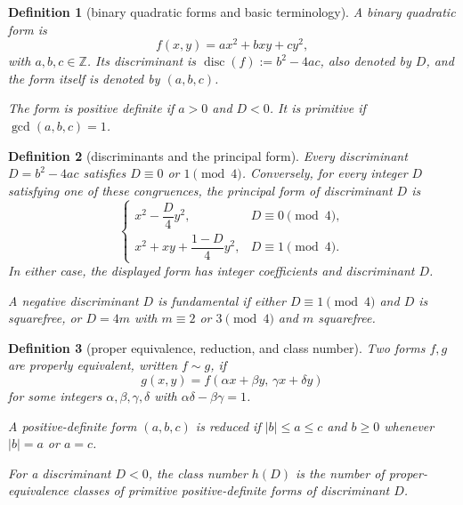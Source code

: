 \documentclass[11pt]{article}
\theoremstyle{ntstyle}
\newtheorem{definition}{Definition}[subsection]
\DeclareMathOperator{\disc}{disc}
\begin{document}
\begin{definition}[binary quadratic forms and basic terminology]\label{def:8.6.1}
	A binary quadratic form is
	\[
		f(x,y)=ax^2+bxy+cy^2,
	\]
	with $a,b,c\in\mathbb{Z}$. Its discriminant is
	$\disc(f):=b^2-4ac$, also denoted by $D$, and the form itself is
	denoted by $(a,b,c)$.

	The form is positive definite if $a>0$ and $D<0$. It is primitive if
	$\gcd(a,b,c)=1$.
\end{definition}
\begin{definition}[discriminants and the principal form]\label{def:8.6.2}
	Every discriminant $D=b^2-4ac$ satisfies
	$D\equiv0$ or $1\pmod{4}$. Conversely, for every integer $D$ satisfying
	one of these congruences, the principal form of discriminant $D$ is
	\[
		\begin{cases}
			x^2-\dfrac{D}{4}y^2,
				& D\equiv0\pmod{4},\\[4pt]
			x^2+xy+\dfrac{1-D}{4}y^2,
				& D\equiv1\pmod{4}.
		\end{cases}
	\]
	In either case, the displayed form has integer coefficients and
	discriminant $D$.

	A negative discriminant $D$ is fundamental if either
	$D\equiv1\pmod{4}$ and $D$ is squarefree, or $D=4m$ with
	$m\equiv2$ or $3\pmod{4}$ and $m$ squarefree.
\end{definition}
\begin{definition}[proper equivalence, reduction, and class number]\label{def:8.6.3}
	Two forms $f,g$ are properly equivalent, written $f\sim g$, if
	\[
		g(x,y)=f(\alpha x+\beta y,\,\gamma x+\delta y)
	\]
	for some integers $\alpha,\beta,\gamma,\delta$ with
	$\alpha\delta-\beta\gamma=1$.

	A positive-definite form $(a,b,c)$ is reduced if
	$|b|\le a\le c$ and $b\ge0$ whenever $|b|=a$ or $a=c$.

	For a discriminant $D<0$, the class number $h(D)$ is the number of
	proper-equivalence classes of primitive positive-definite forms of
	discriminant $D$.
\end{definition}
\end{document}
